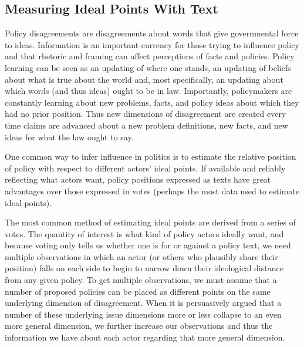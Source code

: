 \documentclass{article}
\begin{document}

\subsection{Measuring Ideal Points With Text}
Policy disagreements are disagreements about words that give governmental force to ideas. Information is an important currency for those trying to influence policy and that rhetoric and framing can affect perceptions of facts and policies. Policy learning can be seen as an updating of where one stands, an updating of beliefs about what is true about the world and, most specifically, an updating about which words (and thus ideas) ought to be in law. Importantly, policymakers are constantly learning about new problems, facts, and policy ideas about which they had no prior position. Thus new dimensions of disagreement are created every time claims are advanced about a new problem definitions, new facts, and new ideas for what the law ought to say.

One common way to infer influence in politics is to estimate the relative position of policy with respect to different actors' ideal points. If available and reliably reflecting what actors want, policy positions expressed as texts have great advantages over those expressed in votes (perhaps the most data used to estimate ideal points).

The most common method of estimating ideal points are derived from a series of votes. The quantity of interest is what kind of policy actors ideally want, and because voting only tells us whether one is for or against a policy text, we need multiple observations in which an actor (or others who plausibly share their position) falls on each side to begin to narrow down their ideological distance from any given policy. To get multiple observations, we must assume that a number of proposed policies can be placed as different points on the same underlying dimension of disagreement. When it is persuasively argued that a number of these underlying issue dimensions more or less collapse to an even more general dimension, we further increase our observations and thus the information we have about each actor regarding that more general dimension. 
\end{document}
